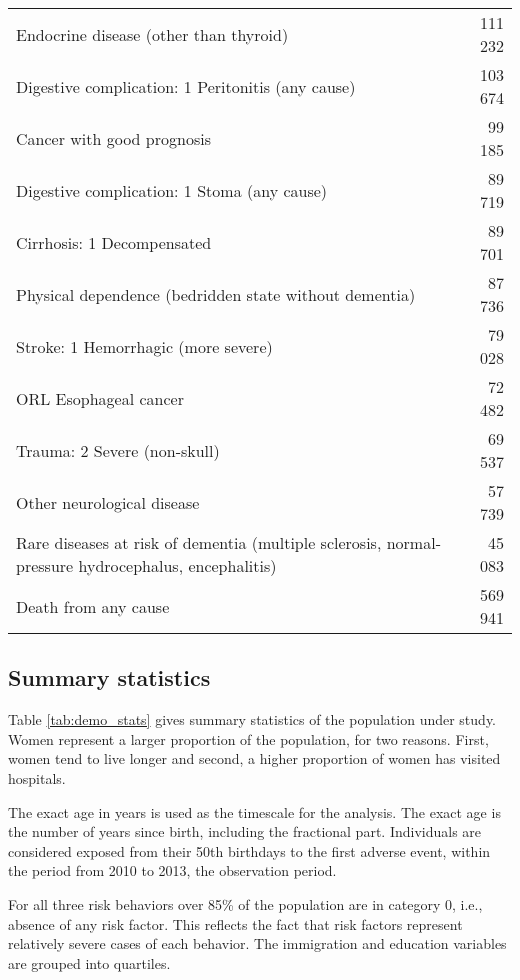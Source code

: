 \documentclass[risks,article,submit,moreauthors,pdftex]{Definitions/mdpi}
\begin{document}
\begin{table}
\begin{tabular}[t]{>{\raggedright\arraybackslash}p{20em}r}
Endocrine disease (other than thyroid) & 111 232\\
Digestive complication: 1 Peritonitis (any cause) & 103 674\\
Cancer with good prognosis & 99 185\\
Digestive complication: 1 Stoma (any cause) & 89 719\\
Cirrhosis: 1 Decompensated & 89 701\\
Physical dependence (bedridden state without dementia) & 87 736\\
Stroke: 1 Hemorrhagic (more severe) & 79 028\\
ORL Esophageal cancer & 72 482\\
Trauma: 2 Severe (non-skull) & 69 537\\
Other neurological disease & 57 739\\
Rare diseases at risk of dementia (multiple sclerosis, normal-pressure hydrocephalus, encephalitis) & 45 083\\
Death from any cause & 569 941\\
\bottomrule
\end{tabular}
\end{table}

\hypertarget{summary-statistics}{%
\subsection{\texorpdfstring{Summary statistics
\label{sec:stats}}{Summary statistics }}\label{summary-statistics}}

Table \ref{tab:demo_stats} gives summary statistics of the population
under study. Women represent a larger proportion of the population, for
two reasons. First, women tend to live longer and second, a higher
proportion of women has visited hospitals.

The exact age in years is used as the timescale for the analysis. The
exact age is the number of years since birth, including the fractional
part. Individuals are considered exposed from their 50th birthdays to
the first adverse event, within the period from 2010 to 2013, the
observation period.

For all three risk behaviors over 85\% of the population are in category
0, i.e., absence of any risk factor. This reflects the fact that risk
factors represent relatively severe cases of each behavior. The
immigration and education variables are grouped into quartiles.
\end{document}
